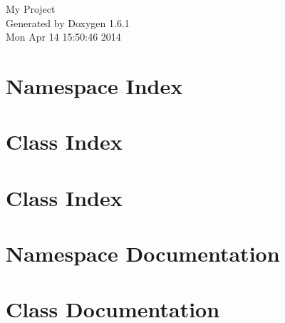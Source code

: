 \documentclass[a4paper]{book}
\begin{document}
\hypersetup{pageanchor=false}
\begin{titlepage}
\vspace*{7cm}
\begin{center}
{\Large My Project }\\
\vspace*{1cm}
{\large Generated by Doxygen 1.6.1}\\
\vspace*{0.5cm}
{\small Mon Apr 14 15:50:46 2014}\\
\end{center}
\end{titlepage}
\clearemptydoublepage
{}
\tableofcontents
\clearemptydoublepage
{}
\hypersetup{pageanchor=true}
\chapter{Namespace Index}

\chapter{Class Index}

\chapter{Class Index}

\chapter{Namespace Documentation}





\chapter{Class Documentation}

















































\printindex
\end{document}
